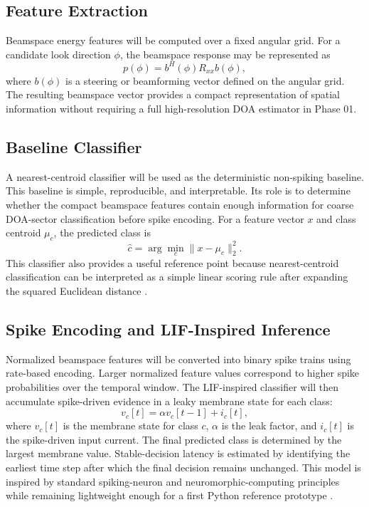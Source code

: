 \documentclass[11pt]{report}
\begin{document}
\subsection{Feature Extraction}

Beamspace energy features will be computed over a fixed angular grid. For a candidate look direction $\phi$, the beamspace response may be represented as
\begin{equation}
    p(\phi)=b^{H}(\phi)R_{xx}b(\phi),
\end{equation}
where $b(\phi)$ is a steering or beamforming vector defined on the angular grid. The resulting beamspace vector provides a compact representation of spatial information without requiring a full high-resolution DOA estimator in Phase 01.

\subsection{Baseline Classifier}

A nearest-centroid classifier will be used as the deterministic non-spiking baseline. This baseline is simple, reproducible, and interpretable. Its role is to determine whether the compact beamspace features contain enough information for coarse DOA-sector classification before spike encoding. For a feature vector $x$ and class centroid $\mu_c$, the predicted class is
\begin{equation}
    \hat{c}=\arg\min_c \lVert x-\mu_c\rVert_2^2.
\end{equation}
This classifier also provides a useful reference point because nearest-centroid classification can be interpreted as a simple linear scoring rule after expanding the squared Euclidean distance \cite{duda2001pattern}.

\subsection{Spike Encoding and LIF-Inspired Inference}

Normalized beamspace features will be converted into binary spike trains using rate-based encoding. Larger normalized feature values correspond to higher spike probabilities over the temporal window. The LIF-inspired classifier will then accumulate spike-driven evidence in a leaky membrane state for each class:
\begin{equation}
    v_c[t]=\alpha v_c[t-1]+i_c[t],
\end{equation}
where $v_c[t]$ is the membrane state for class $c$, $\alpha$ is the leak factor, and $i_c[t]$ is the spike-driven input current. The final predicted class is determined by the largest membrane value. Stable-decision latency is estimated by identifying the earliest time step after which the final decision remains unchanged. This model is inspired by standard spiking-neuron and neuromorphic-computing principles while remaining lightweight enough for a first Python reference prototype \cite{gerstner2002spiking,roy2019towards}.
\end{document}
